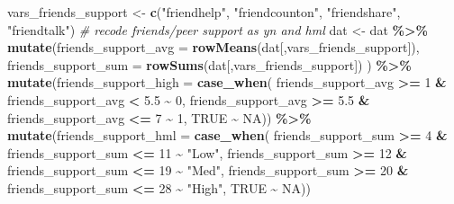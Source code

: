 \documentclass[
]{article}
\newenvironment{Shaded}{\begin{snugshade}}{\end{snugshade}}
\newcommand{\AttributeTok}[1]{\textcolor[rgb]{0.13,0.29,0.53}{#1}}
\newcommand{\CommentTok}[1]{\textcolor[rgb]{0.56,0.35,0.01}{\textit{#1}}}
\newcommand{\ConstantTok}[1]{\textcolor[rgb]{0.56,0.35,0.01}{#1}}
\newcommand{\DecValTok}[1]{\textcolor[rgb]{0.00,0.00,0.81}{#1}}
\newcommand{\FloatTok}[1]{\textcolor[rgb]{0.00,0.00,0.81}{#1}}
\newcommand{\FunctionTok}[1]{\textcolor[rgb]{0.13,0.29,0.53}{\textbf{#1}}}
\newcommand{\NormalTok}[1]{#1}
\newcommand{\OtherTok}[1]{\textcolor[rgb]{0.56,0.35,0.01}{#1}}
\newcommand{\SpecialCharTok}[1]{\textcolor[rgb]{0.81,0.36,0.00}{\textbf{#1}}}
\newcommand{\StringTok}[1]{\textcolor[rgb]{0.31,0.60,0.02}{#1}}
\begin{document}
\begin{Shaded}
\begin{Highlighting}[]
\NormalTok{vars\_friends\_support }\OtherTok{\textless{}{-}} \FunctionTok{c}\NormalTok{(}\StringTok{"friendhelp"}\NormalTok{, }\StringTok{"friendcounton"}\NormalTok{, }\StringTok{"friendshare"}\NormalTok{, }\StringTok{"friendtalk"}\NormalTok{)}
\CommentTok{\# recode friends/peer support as yn and hml}
\NormalTok{dat }\OtherTok{\textless{}{-}}\NormalTok{ dat }\SpecialCharTok{\%\textgreater{}\%}
  \FunctionTok{mutate}\NormalTok{(}\AttributeTok{friends\_support\_avg =} \FunctionTok{rowMeans}\NormalTok{(dat[,vars\_friends\_support]),}
         \AttributeTok{friends\_support\_sum =} \FunctionTok{rowSums}\NormalTok{(dat[,vars\_friends\_support])}
\NormalTok{  ) }\SpecialCharTok{\%\textgreater{}\%}
  \FunctionTok{mutate}\NormalTok{(}\AttributeTok{friends\_support\_high =} \FunctionTok{case\_when}\NormalTok{(}
\NormalTok{    friends\_support\_avg }\SpecialCharTok{\textgreater{}=} \DecValTok{1} \SpecialCharTok{\&}\NormalTok{ friends\_support\_avg }\SpecialCharTok{\textless{}} \FloatTok{5.5} \SpecialCharTok{\textasciitilde{}} \DecValTok{0}\NormalTok{,}
\NormalTok{    friends\_support\_avg }\SpecialCharTok{\textgreater{}=} \FloatTok{5.5} \SpecialCharTok{\&}\NormalTok{ friends\_support\_avg }\SpecialCharTok{\textless{}=} \DecValTok{7} \SpecialCharTok{\textasciitilde{}} \DecValTok{1}\NormalTok{,}
    \ConstantTok{TRUE} \SpecialCharTok{\textasciitilde{}} \ConstantTok{NA}\NormalTok{)) }\SpecialCharTok{\%\textgreater{}\%}
  \FunctionTok{mutate}\NormalTok{(}\AttributeTok{friends\_support\_hml =} \FunctionTok{case\_when}\NormalTok{(}
\NormalTok{    friends\_support\_sum }\SpecialCharTok{\textgreater{}=} \DecValTok{4} \SpecialCharTok{\&}\NormalTok{ friends\_support\_sum }\SpecialCharTok{\textless{}=} \DecValTok{11} \SpecialCharTok{\textasciitilde{}} \StringTok{"Low"}\NormalTok{,}
\NormalTok{    friends\_support\_sum }\SpecialCharTok{\textgreater{}=} \DecValTok{12} \SpecialCharTok{\&}\NormalTok{ friends\_support\_sum }\SpecialCharTok{\textless{}=} \DecValTok{19} \SpecialCharTok{\textasciitilde{}} \StringTok{"Med"}\NormalTok{,}
\NormalTok{    friends\_support\_sum }\SpecialCharTok{\textgreater{}=} \DecValTok{20} \SpecialCharTok{\&}\NormalTok{ friends\_support\_sum }\SpecialCharTok{\textless{}=} \DecValTok{28} \SpecialCharTok{\textasciitilde{}} \StringTok{"High"}\NormalTok{,}
    \ConstantTok{TRUE} \SpecialCharTok{\textasciitilde{}} \ConstantTok{NA}\NormalTok{))}
\end{Highlighting}
\end{Shaded}
\end{document}
